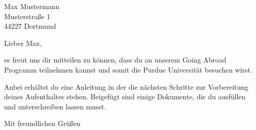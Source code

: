 \documentclass[
  pepbrief,
  fontsize=12pt,
  paper=a4,
  DIV=14,
  parskip=half,
  backaddress=false,
]{scrlttr2}
\author{Henning Moldenhauer}
\begin{document}
\begin{letter}{%
  Max Mustermann\\
  Musterstraße 1\\
  44227 Dortmund%
}
\opening{Lieber Max,}

es freut uns dir mitteilen zu können, dass du an unserem Going Abroad Programm
teilnehmen kannst und somit die Purdue Universität besuchen wirst.

Anbei erhältst du eine Anleitung in der die nächsten Schritte zur Vorbereitung
deines Aufenthaltes stehen.
Beigefügt sind einige Dokumente, die du ausfüllen und unterschreiben lassen
musst.

\closing{Mit freundlichen Grüßen}

\end{letter}
\end{document}

